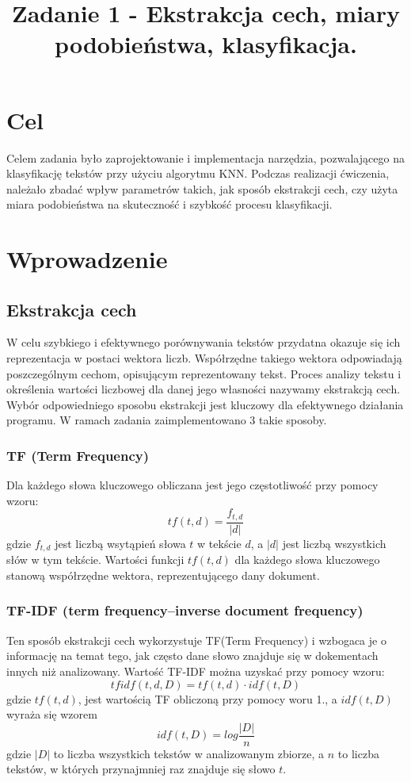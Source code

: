 \documentclass{classrep}
\author{
  \studentinfo{Paweł Młynarczyk}{210278} \and
  \studentinfo{Mateusz Kuźniarek}{210245}
}
\title{Zadanie 1 - Ekstrakcja cech, miary podobieństwa, klasyfikacja.}
\begin{document}
\maketitle

\section{Cel}
Celem zadania było zaprojektowanie i implementacja narzędzia, pozwalającego na klasyfikację tekstów przy użyciu algorytmu KNN. Podczas realizacji ćwiczenia, należało zbadać wpływ parametrów takich, jak sposób ekstrakcji cech, czy użyta miara podobieństwa na skuteczność i szybkość procesu klasyfikacji.

\section{Wprowadzenie}
\subsection{Ekstrakcja cech}
W celu szybkiego i efektywnego porównywania tekstów przydatna okazuje się ich reprezentacja w postaci wektora liczb. Współrzędne takiego wektora odpowiadają poszczególnym cechom, opisującym reprezentowany tekst. Proces analizy tekstu i określenia wartości liczbowej dla danej jego własności nazywamy ekstrakcją cech. Wybór odpowiedniego sposobu ekstrakcji jest kluczowy dla efektywnego działania programu. W ramach zadania zaimplementowano 3 takie sposoby.

\subsubsection{TF (Term Frequency)}
Dla każdego słowa kluczowego obliczana jest jego częstotliwość przy pomocy wzoru: 
\begin{equation}
tf(t,d) =  \frac{f_{t,d}}{|d|}
\end{equation}
gdzie \(f_{t,d}\) jest liczbą wsytąpień słowa \(t\) w tekście \(d\), a \(|d|\) jest liczbą wszystkich słów w tym tekście. Wartości funkcji \(tf(t,d)\) dla każdego słowa kluczowego stanową współrzędne wektora, reprezentującego dany dokument.

\subsubsection{TF-IDF (term frequency–inverse document frequency)}
Ten sposób ekstrakcji cech wykorzystuje TF(Term Frequency) i wzbogaca je o informację na temat tego, jak często dane słowo znajduje się w dokementach innych niż analizowany. Wartość TF-IDF można uzyskać przy pomocy wzoru: 
\begin{equation}
tfidf(t,d,D) = tf(t,d) \cdot idf(t,D)
\end{equation}
gdzie \(tf(t,d)\), jest wartością TF obliczoną przy pomocy woru 1., a \(idf(t,D)\) wyraża się wzorem
\begin{equation}
idf(t,D) = log\frac{|D|}{n}
\end{equation}
gdzie \(|D|\) to liczba wszystkich tekstów w analizowanym zbiorze, a \(n\) to liczba tekstów, w których przynajmniej raz znajduje się słowo \(t\).
\end{document}
